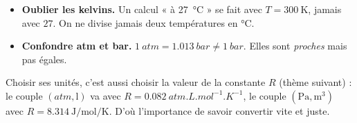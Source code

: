 \documentclass[11pt,a4paper]{article}
\begin{document}
\begin{piege}
\begin{itemize}[leftmargin=1.4em,topsep=2pt,itemsep=1.5pt]
  \item \textbf{Oublier les kelvins.} Un calcul « à \qty{27}{\degreeCelsius} » se fait avec
        $T=\qty{300}{\kelvin}$, jamais avec $27$. On ne divise jamais deux températures en \si{\degreeCelsius}.
  \item \textbf{Confondre \si{atm} et \si{bar}.} $\qty{1}{atm}=\qty{1.013}{bar}\neq\qty{1}{bar}$.
        Elles sont \emph{proches} mais pas égales.
\end{itemize}
\end{piege}

\begin{remarque}
Choisir ses unités, c'est aussi choisir la valeur de la constante $R$ (thème suivant) : le couple
$(\si{atm},\si{\litre})$ va avec $R=\qty{0.082}{atm.L.mol^{-1}.K^{-1}}$, le couple
$(\si{\pascal},\si{\meter\cubed})$ avec $R=\qty{8.314}{\joule\per\mole\per\kelvin}$. D'où l'importance
de savoir convertir vite et juste.
\end{remarque}
\end{document}
